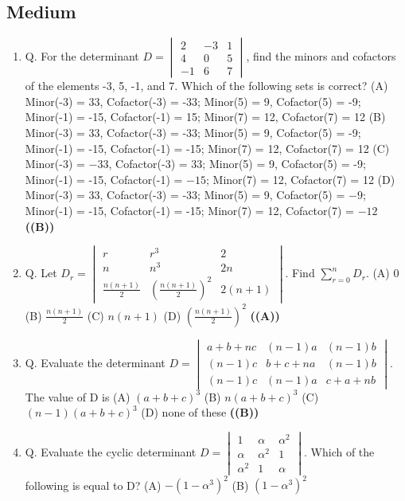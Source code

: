 \documentclass{article}
\begin{document}
\subsection{Medium}
\begin{enumerate}
\item Q. For the determinant
$D=\begin{vmatrix} 2 & -3 & 1 \\ 4 & 0 & 5 \\ -1 & 6 & 7 \end{vmatrix}$,
find the minors and cofactors of the elements -3, 5, -1, and 7. Which of the following sets is correct?
(A) Minor(-3) = 33, Cofactor(-3) = -33; Minor(5) = 9, Cofactor(5) = -9; Minor(-1) = -15, Cofactor(-1) = 15; Minor(7) = 12, Cofactor(7) = 12
(B) Minor(-3) = 33, Cofactor(-3) = -33; Minor(5) = 9, Cofactor(5) = -9; Minor(-1) = -15, Cofactor(-1) = -15; Minor(7) = 12, Cofactor(7) = 12
(C) Minor(-3) = $-33$, Cofactor(-3) = 33; Minor(5) = 9, Cofactor(5) = -9; Minor(-1) = -15, Cofactor(-1) = $-15$; Minor(7) = 12, Cofactor(7) = 12
(D) Minor(-3) = 33, Cofactor(-3) = -33; Minor(5) = 9, Cofactor(5) = $-9$; Minor(-1) = -15, Cofactor(-1) = -15; Minor(7) = 12, Cofactor(7) = $-12$ \hfill \textbf{((B))}
\item Q. Let
$D_r = \begin{vmatrix} r & r^3 & 2 \\ n & n^3 & 2n \\ \frac{n(n+1)}{2} & (\frac{n(n+1)}{2})^2 & 2(n+1) \end{vmatrix}$.
Find $\sum_{r=0}^{n} D_r$.
(A) 0
(B) $\frac{n(n+1)}{2}$
(C) $n(n + 1)$
(D) $(\frac{n(n+1)}{2})^2$ \hfill \textbf{((A))}
\item Q. Evaluate the determinant
$D = \begin{vmatrix} a+b+nc & (n-1)a & (n-1)b \\ (n-1)c & b+c+na & (n-1)b \\ (n-1)c & (n-1)a & c+a+nb \end{vmatrix}$.
The value of D is
(A) $(a + b + c)^3$
(B) $n (a + b + c)^3$
(C) $(n - 1) (a + b + c)^3$
(D) none of these \hfill \textbf{((B))}
\item Q. Evaluate the cyclic determinant
$D = \begin{vmatrix} 1 & \alpha & \alpha^2 \\ \alpha & \alpha^2 & 1 \\ \alpha^2 & 1 & \alpha \end{vmatrix}$.
Which of the following is equal to D?
(A) $-(1- \alpha^3)^2$
(B) $(1 - \alpha^3)^2$

\end{enumerate}
\end{document}

